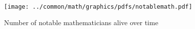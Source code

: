 \begin{figure}
  \centering%
  \texttt{[image: ../common/math/graphics/pdfs/notablemath.pdf]}
  \caption{
    Number of notable mathematicians alive over time
    \label{fig:intro_timeline}
    }
\end{figure}

